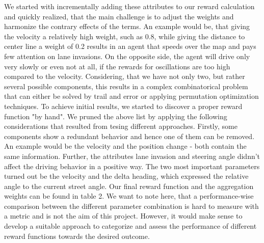 \documentclass[letterpaper, 10 pt, conference]{ieeeconf}  %
\begin{document}
We started with incrementally adding these attributes to our reward calculation and quickly realized, that the main challenge is to adjust the weights and harmonize the contrary effects of the terms.
An example would be, that giving the velocity a relatively high weight, such as 0.8, while giving the distance to center line a weight of 0.2 results in an agent that speeds over the map and pays few attention on lane invasions. On the opposite side, the agent will drive only very slowly or even not at all, if the rewards for oscillations are too high compared to the velocity. Considering, that we have not only two, but rather several possible components, this results in a complex combinatorical problem that can either be solved by trail and error or applying permutation optimization techniques. To achieve initial results, we started to discover a proper reward function "by hand". 
\newline
We pruned the above list by applying the following considerations that resulted from tesing different approaches. Firstly, some components show a redundant behavior and hence one of them can be removed. An example would be the velocity and the position change - both contain the same information. Further, the attributes lane invasion and steering angle didnn't affect the driving behavior in a positive way. The two most important parameters turned out be the velocity and the delta heading, which expressed the relative angle to the current street angle. Our final reward function and the aggregation weights can be found in table 2.
\newline
We want to note here, that a performance-wise comparison between the different parameter combination is hard to measure with a metric and is not the aim of this project. However, it would make sense to develop a suitable approach to categorize and assess the performance of different reward functions towards the desired outcome. 
\end{document}
